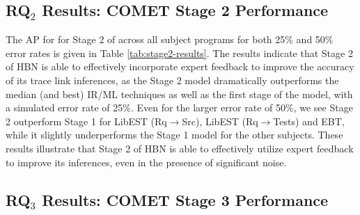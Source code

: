 
\subsection{RQ$_2$ Results: C{\footnotesize OMET} Stage 2 Performance}
\label{sub:results-rq2}




The AP for for Stage 2 of \Comet across all subject programs for both 25\% and 50\% error rates is given in Table \ref{tab:stage2-results}. The results indicate that Stage 2 of \Comets HBN is able to effectively incorporate expert feedback to improve the accuracy of its trace link inferences, as the Stage 2 model dramatically outperforms the median (and best) IR/ML techniques as well as the first stage of the model, with a simulated error rate of 25\%.  Even for the larger error rate of 50\%, we see Stage 2 outperform Stage 1 for LibEST (Rq$\rightarrow$Src), LibEST (Rq$\rightarrow$Tests) and EBT, while it slightly underperforms the Stage 1 model for the other subjects. These results illustrate that Stage 2 of \Comets HBN is able to effectively utilize expert feedback to improve its inferences, even in the presence of significant noise.


\subsection{RQ$_3$ Results: C{\footnotesize OMET} Stage 3 Performance}
\label{sub:results-rq3}

